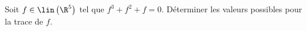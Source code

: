 \begin{enonce}
\begin{exercise}[ID={RMS 121-2 E1117 (CCP)},subtitle={},tags={}, difficulty={0}]
Soit $f\in\lin\left(\R^5\right)$ tel que $f^3+f^2+f=0$.
Déterminer les valeurs possibles pour la trace de $f$.
\end{exercise}
\begin{solution}
\end{solution}
\end{enonce}
